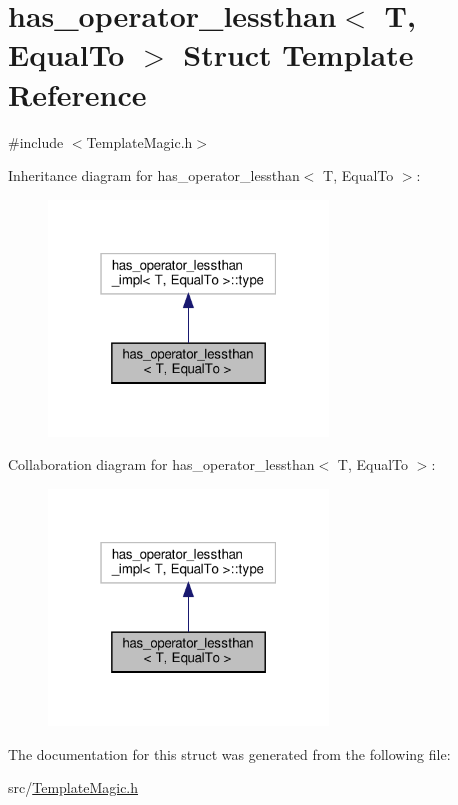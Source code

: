\hypertarget{structhas__operator__lessthan}{}\section{has\+\_\+operator\+\_\+lessthan$<$ T, Equal\+To $>$ Struct Template Reference}
\label{structhas__operator__lessthan}


{\ttfamily \#include $<$Template\+Magic.\+h$>$}



Inheritance diagram for has\+\_\+operator\+\_\+lessthan$<$ T, Equal\+To $>$\+:\nopagebreak
\begin{figure}[H]
\begin{center}
\leavevmode
\includegraphics[width=211pt]{structhas__operator__lessthan__inherit__graph}
\end{center}
\end{figure}


Collaboration diagram for has\+\_\+operator\+\_\+lessthan$<$ T, Equal\+To $>$\+:\nopagebreak
\begin{figure}[H]
\begin{center}
\leavevmode
\includegraphics[width=211pt]{structhas__operator__lessthan__coll__graph}
\end{center}
\end{figure}


The documentation for this struct was generated from the following file\+:\begin{DoxyCompactItemize}
\item 
src/\hyperlink{_template_magic_8h}{Template\+Magic.\+h}\end{DoxyCompactItemize}
